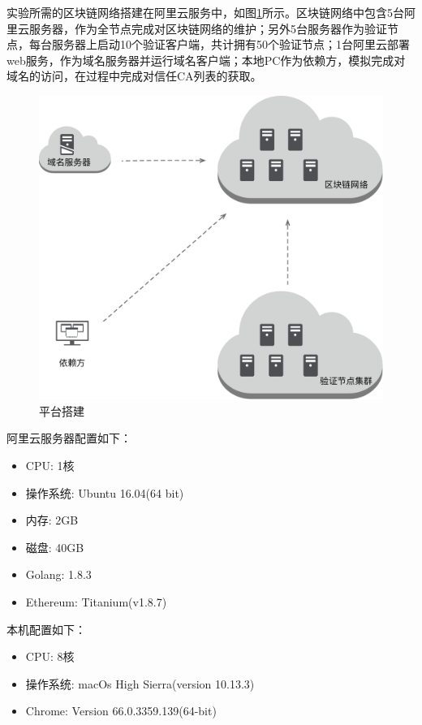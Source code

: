 实验所需的区块链网络搭建在阿里云服务中，如图\ref{fig:platform}所示。区块链网络中包含5台阿里云服务器，作为全节点完成对区块链网络的维护；另外5台服务器作为验证节点，每台服务器上启动10个验证客户端，共计拥有50个验证节点；1台阿里云部署web服务，作为域名服务器并运行域名客户端；本地PC作为依赖方，模拟完成对域名的访问，在过程中完成对信任CA列表的获取。

\begin{figure}[htbp]
 	\centering
 	\includegraphics[scale = 0.4]{img/platform}
 	\caption{平台搭建}\label{fig:platform}
\end{figure}

阿里云服务器配置如下：

\begin{itemize}
	\item CPU: 1核
	\item 操作系统: Ubuntu 16.04(64 bit)
	\item 内存: 2GB
	\item 磁盘: 40GB
	\item Golang: 1.8.3
	\item Ethereum: Titanium(v1.8.7)
\end{itemize}

本机配置如下：
\begin{itemize}
	\item CPU: 8核
	\item 操作系统: macOs High Sierra(version 10.13.3)
	\item Chrome: Version 66.0.3359.139(64-bit)
\end{itemize}

